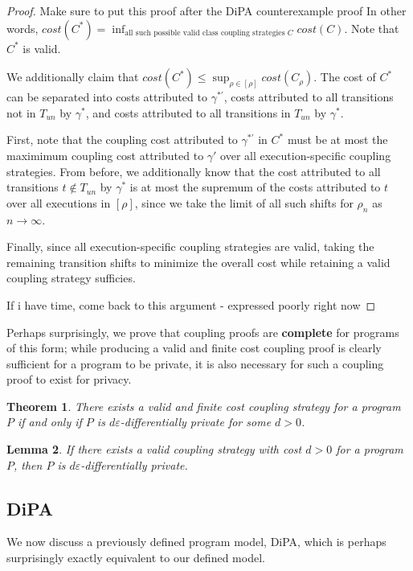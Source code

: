 \documentclass[12pt]{article}
\newtheorem{thm}{Theorem}[section]
\newtheorem{lemma}[thm]{Lemma}
\theoremstyle{definition}
\begin{document}
\begin{proof}{\color{red} Make sure to put this proof after the DiPA counterexample proof}
    In other words, $cost(C^*) = \inf_{\text{all such possible valid class coupling strategies } C} cost(C)$. Note that $C^*$ is valid. 

    We additionally claim that $cost(C^*)\leq \sup_{\rho\in [\rho]}cost(C_\rho)$. The cost of $C^*$ can be separated into costs attributed to $\gamma^{*\prime}$, costs attributed to all transitions not in $T_{un}$ by $\gamma^*$, and costs attributed to all transitions in $T_{un}$ by $\gamma^*$. 
    
    First, note that the coupling cost attributed to $\gamma^{*\prime}$ in $C^*$ must be at most the maximimum coupling cost attributed to $\gamma'$ over all execution-specific coupling strategies. From before, we additionally know that the cost attributed to all transitions $t\notin T_{un}$ by $\gamma^*$ is at most the supremum of the costs attributed to $t$ over all executions in $[\rho]$, since we take the limit of all such shifts for $\rho_n$ as $n\to\infty$.

    Finally, since all execution-specific coupling strategies are valid, taking the remaining transition shifts to minimize the overall cost while retaining a valid coupling strategy sufficies. 

    {\color{red} If i have time, come back to this argument - expressed poorly right now}
\end{proof}

Perhaps surprisingly, we prove that coupling proofs are \textbf{complete} for programs of this form; while producing a valid and finite cost coupling proof is clearly sufficient for a program to be private, it is also necessary for such a coupling proof to exist for privacy. 

\begin{thm}
    There exists a valid and finite cost coupling strategy for a program $P$ if and only if $P$ is $d\varepsilon$-differentially private for some $d>0$. 
\end{thm}

\begin{lemma}
    If there exists a valid coupling strategy with cost $d>0$ for a program $P$, then $P$ is $d\varepsilon$-differentially private. 
\end{lemma}


\subsection{DiPA}

We now discuss a previously defined program model, DiPA, which is perhaps surprisingly exactly equivalent to our defined model. 
\end{document}
